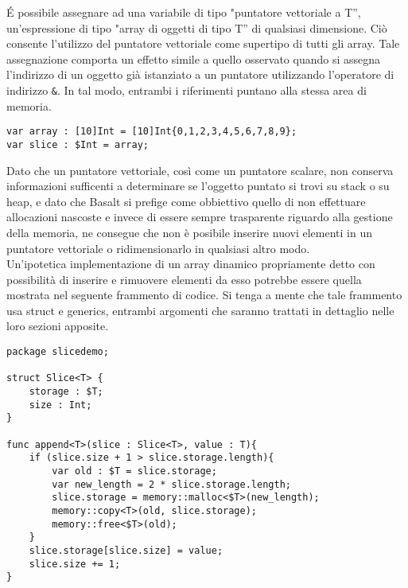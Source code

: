 É possibile assegnare ad una variabile di tipo "puntatore vettoriale a T”, un’espressione di tipo "array di oggetti di tipo T” 
di qualsiasi dimensione. Ciò consente l'utilizzo del puntatore vettoriale come supertipo di tutti gli array. Tale assegnazione 
comporta un effetto simile a quello osservato quando si assegna l'indirizzo di un oggetto già istanziato a un puntatore utilizzando 
l'operatore di indirizzo \texttt{\&}. In tal modo, entrambi i riferimenti puntano alla stessa area di memoria. \\

\vspace{0.5cm}
\begin{lstlisting}[frame=single]
var array : [10]Int = [10]Int{0,1,2,3,4,5,6,7,8,9};
var slice : $Int = array;
\end{lstlisting}
\vspace{0.5cm}

Dato che un puntatore vettoriale, così come un puntatore scalare, non conserva informazioni sufficenti a determinare se 
l’oggetto puntato si trovi su stack o su heap, e dato che Basalt si prefige come obbiettivo quello di non 
effettuare allocazioni nascoste e invece di essere sempre trasparente riguardo alla gestione della memoria, ne consegue che non 
è posibile inserire nuovi elementi in un puntatore vettoriale o ridimensionarlo in qualsiasi altro modo. \\

Un’ipotetica implementazione di un array dinamico propriamente detto con possibilità di 
inserire e rimuovere elementi da esso potrebbe essere quella mostrata nel seguente frammento di codice. 
Si tenga a mente che tale frammento usa struct e generics, entrambi argomenti che saranno trattati in 
dettaglio nelle loro sezioni apposite. \\


\vspace{0.5cm}
\begin{lstlisting}[frame=single]
package slicedemo;

struct Slice<T> {
    storage : $T;
    size : Int;
}

func append<T>(slice : Slice<T>, value : T){
    if (slice.size + 1 > slice.storage.length){
        var old : $T = slice.storage; 
        var new_length = 2 * slice.storage.length;
        slice.storage = memory::malloc<$T>(new_length);
        memory::copy<T>(old, slice.storage);
        memory::free<$T>(old);
    }
    slice.storage[slice.size] = value;
    slice.size += 1;
}
\end{lstlisting}
\vspace{0.5cm}